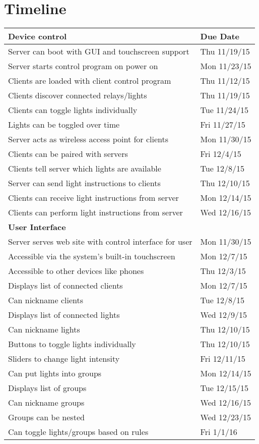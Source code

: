 \documentclass[oneside,openright]{book}
\begin{document}
\section{Timeline}
\begin{tabular}{ | l | l | }
   \hline
   \textbf{Device control} & \textbf{Due Date} \\ \hline

   Server can boot with GUI and touchscreen support & Thu 11/19/15 \\ \hline
   Server starts control program on power on & Mon 11/23/15 \\ \hline
   Clients are loaded with client control program & Thu 11/12/15 \\ \hline
   Clients discover connected relays/lights & Thu 11/19/15 \\ \hline
   Clients can toggle lights individually & Tue 11/24/15 \\ \hline
   Lights can be toggled over time & Fri 11/27/15 \\ \hline
   Server acts as wireless access point for clients & Mon 11/30/15 \\ \hline
   Clients can be paired with servers & Fri 12/4/15 \\ \hline
   Clients tell server which lights are available & Tue 12/8/15 \\ \hline
   Server can send light instructions to clients & Thu 12/10/15 \\ \hline
   Clients can receive light instructions from server & Mon 12/14/15 \\ \hline
   Clients can perform light instructions from server & Wed 12/16/15 \\ \hline
   
   \textbf{User Interface} & \\ \hline
   
   Server serves web site with control interface for user & Mon 11/30/15 \\ \hline
   Accessible via the system’s built-in touchscreen & Mon 12/7/15 \\ \hline
   Accessible to other devices like phones & Thu 12/3/15 \\ \hline
   Displays list of connected clients & Mon 12/7/15 \\ \hline
   Can nickname clients & Tue 12/8/15 \\ \hline
   Displays list of connected lights & Wed 12/9/15 \\ \hline
   Can nickname lights & Thu 12/10/15 \\ \hline
   Buttons to toggle lights individually & Thu 12/10/15 \\ \hline
   Sliders to change light intensity & Fri 12/11/15 \\ \hline
   Can put lights into groups & Mon 12/14/15 \\ \hline
   Displays list of groups & Tue 12/15/15 \\ \hline
   Can nickname groups & Wed 12/16/15 \\ \hline
   Groups can be nested & Wed 12/23/15 \\ \hline
   Can toggle lights/groups based on rules & Fri 1/1/16 \\ \hline
   

\end{tabular}
\end{document}
